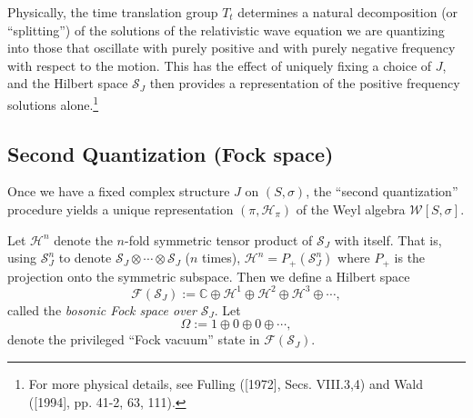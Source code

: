 \documentclass[12pt]{article}
\theoremstyle{remark}
\theoremstyle{definition}
\newcommand{\alg}[1]{\mathcal{#1}}
\newcommand{\hil}[1]{\mathcal{#1}}
\begin{document}
  \noindent Physically, the time translation group 
  $T_{t}$ determines a 
  natural decomposition (or ``splitting'') of the solutions of the 
  relativistic wave equation we are quantizing into those 
  that oscillate with purely positive and with purely negative frequency 
  with respect to the motion.  This has the effect of uniquely fixing a choice of 
  $J$, and the Hilbert space 
  $\hil{S}_{J}$ then provides a representation of the positive frequency solutions 
  alone.\footnote{For more physical details, see Fulling ([1972], Secs. VIII.3,4) and Wald ([1994], 
  pp. 41-2, 63, 111).}

\subsection{Second Quantization (Fock space)}
Once we have a fixed complex structure $J$ on $(S,\sigma )$, the
``second quantization'' procedure yields a unique representation $(\pi
,\hil{H}_{\pi})$ of the Weyl algebra $\alg{W}[S,\sigma ]$.

Let $\hil{H}^{n}$ denote the $n$-fold symmetric tensor product of
$\hil{S}_{J}$ with itself.  That is, using $\hil{S}_{J}^{n}$ to 
denote $\hil{S}_{J}\otimes \cdots
\otimes \hil{S}_{J}$ ($n$ times), 
 $\hil{H}^{n}=P_{+}(\hil{S}_{J}^{n})$ where $P_{+}$ is the projection onto the
symmetric subspace.  Then we define a Hilbert space
\begin{equation} \hil{F}(\hil{S}_{J}):=\mathbb{C}\oplus \hil{H}^{1}\oplus
  \hil{H}^{2}\oplus \hil{H}^{3} \oplus \cdots ,\end{equation} 
called the \emph{bosonic Fock space over} $\hil{S}_{J}$.  Let \begin{equation}
\Omega := 1\oplus 0 \oplus 0 \oplus \cdots ,\end{equation}
denote the privileged ``Fock vacuum'' state in $\hil{F}(\hil{S}_{J})$. 
\end{document}
